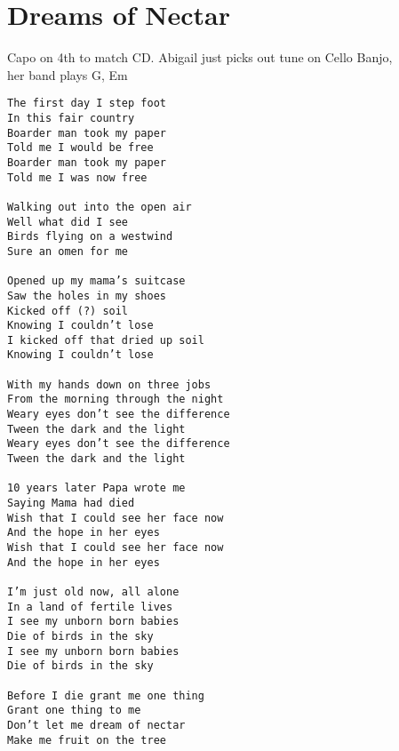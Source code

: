 \documentclass[leqno]{memoir}
\begin{document}
\chapter{Dreams of Nectar}
Capo on 4th to match CD.
Abigail just picks out tune on Cello Banjo, \\
her band plays G, Em
\begin{verbatim}
The first day I step foot
In this fair country
Boarder man took my paper
Told me I would be free
Boarder man took my paper
Told me I was now free

Walking out into the open air
Well what did I see
Birds flying on a westwind
Sure an omen for me

Opened up my mama’s suitcase
Saw the holes in my shoes
Kicked off (?) soil
Knowing I couldn’t lose
I kicked off that dried up soil
Knowing I couldn’t lose

With my hands down on three jobs
From the morning through the night
Weary eyes don’t see the difference
Tween the dark and the light
Weary eyes don’t see the difference
Tween the dark and the light

10 years later Papa wrote me
Saying Mama had died
Wish that I could see her face now
And the hope in her eyes
Wish that I could see her face now
And the hope in her eyes

I’m just old now, all alone
In a land of fertile lives
I see my unborn born babies
Die of birds in the sky
I see my unborn born babies
Die of birds in the sky

Before I die grant me one thing
Grant one thing to me
Don’t let me dream of nectar
Make me fruit on the tree
\end{verbatim}
\newpage
\end{document}
